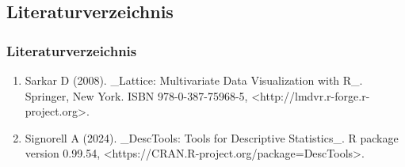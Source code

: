 \documentclass{beamer}
\begin{document}
\begin{frame}[noframenumbering]
	\section{Literaturverzeichnis}
	\frametitle{Literaturverzeichnis}
	\begin{enumerate}[]
		\item Sarkar D (2008). \_Lattice: Multivariate Data Visualization with R\_.
		Springer, New York. ISBN 978-0-387-75968-5,
		<http://lmdvr.r-forge.r-project.org>.
		\item Signorell A (2024). \_DescTools: Tools for Descriptive Statistics\_. R package
		version 0.99.54, <https://CRAN.R-project.org/package=DescTools>.
	\end{enumerate}
	
\end{frame}
\end{document}
